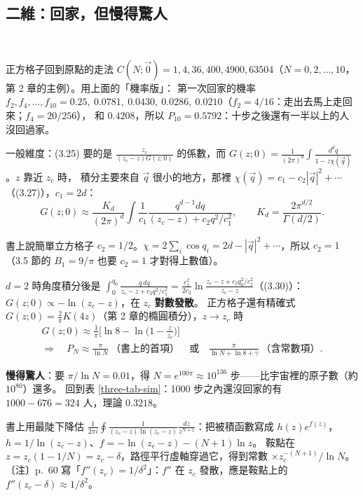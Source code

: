 \subsection{二維：回家，但慢得驚人}
\ 

正方格子回到原點的走法 $C(N;\vec0)=1,4,36,400,4900,63504$（$N=0,2,\dots,10$，第 2 章的主例）。用上面的「機率版」：
第一次回家的機率 $f_2,f_4,\dots,f_{10}=0.25,\ 0.0781,\ 0.0430,\ 0.0286,\ 0.0210$（$f_2=4/16$：走出去馬上走回來；$f_4=20/256$），
和 $0.4208$，所以 $P_{10}=0.5792$：十步之後還有一半以上的人沒回過家。

一般維度：(3.25) 要的是 $\frac{z_c}{(z_c-z)G(z;0)}$ 的係數，而 $G(z;0)=\frac{1}{(2\pi)^d}\int\frac{d^dq}{1-z\chi(\vec q)}$。$z$ 靠近 $z_c$ 時，
積分主要來自 $\vec q$ 很小的地方，那裡 $\chi(\vec q)=c_1-c_2|\vec q|^2+\cdots$（(3.27)），$c_1=2d$：
\[G(z;0)\approx\frac{K_d}{(2\pi)^d}\int\frac{1}{c_1}\frac{q^{d-1}dq}{(z_c-z)+c_2q^2/c_1^2},\qquad K_d=\frac{2\pi^{d/2}}{\Gamma(d/2)}.\tag{3.28, 3.29}\]
\begin{errbox}[p.~59，(3.27) 後]
書上說簡單立方格子 $c_2=1/2$。$\chi=2\sum_i\cos q_i=2d-|\vec q|^2+\cdots$，所以 $c_2=1$（3.5 節的 $B_1=9/\pi$ 也要 $c_2=1$ 才對得上數值）。
\end{errbox}
$d=2$ 時角度積分後是 $\int_0^{q_0}\frac{q\,dq}{z_c-z+c_2q^2/c_1^2}=\frac{c_1^2}{2c_2}\ln\frac{z_c-z+c_2q_0^2/c_1^2}{z_c-z}$（(3.30)）：$G(z;0)\propto-\ln(z_c-z)$，在 $z_c$ \textbf{對數發散}。
正方格子還有精確式 $G(z;0)=\frac2\pi K(4z)$（第 2 章的橢圓積分），$z\to z_c$ 時
\begin{gather*}
G(z;0)\approx\frac1\pi\Big[\ln8-\ln\Big(1-\frac{z}{z_c}\Big)\Big]\\
\Rightarrow\quad P_N\approx\frac{\pi}{\ln N}\ \text{（書上的首項）}\quad\text{或}\quad\frac{\pi}{\ln N+\ln8+\gamma}\ \text{（含常數項）}.
\end{gather*}
\begin{table}[H]
\centering
\ThreeTabNoReturn
\caption{三種維度「$N$ 步都還沒回家」的機率 $P_N$：精確值（更新方程）與漸近式。二維的 $\pi/\ln N$ 在 $N=10$ 時是 1.364，比 1 還大；它要 $N$ 非常大才準}\label{three-tab-noreturn}
\end{table}
\textbf{慢得驚人}：要 $\pi/\ln N=0.01$，得 $N=e^{100\pi}\approx10^{136}$ 步——比宇宙裡的原子數（約 $10^{80}$）還多。
回到表 \ref{three-tab-sim}：1000 步之內還沒回家的有 $1000-676=324$ 人，理論 $0.3218$。

\begin{notebox}
書上用最陡下降估 $\frac{1}{2\pi i}\oint\frac{1}{(z_c-z)\ln(z_c-z)}\frac{dz}{z^{N+1}}$：把被積函數寫成 $h(z)e^{f(z)}$，$h=1/\ln(z_c-z)$、$f=-\ln(z_c-z)-(N+1)\ln z$。
鞍點在 $z=z_c(1-1/N)=z_c-\delta$，路徑平行虛軸穿過它，得到常數 $\times z_c^{-(N+1)}/\ln N$。
〔注〕p.~60 寫「$f''(z_c)=1/\delta^2$」：$f''$ 在 $z_c$ 發散，應是鞍點上的 $f''(z_c-\delta)\approx1/\delta^2$。
\end{notebox}

